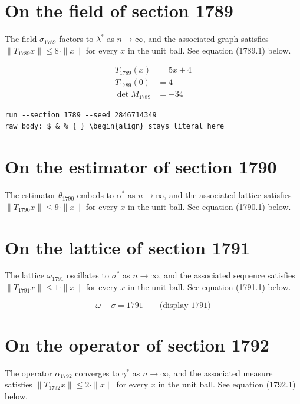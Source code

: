 \documentclass{article}
\begin{document}
\section{On the field of section 1789}
The field $\sigma_{1789}$ factors to $\lambda^{*}$ as $n \to \infty$,
and the associated graph satisfies $\|T_{1789} x\| \leq 8 \cdot \|x\|$
for every $x$ in the unit ball. See equation (1789.1) below.

\begin{align}
T_{1789}(x) &= 5 x + 4 \\
T_{1789}(0) &= 4 \\
\det M_{1789} &= -34
\end{align}

\begin{verbatim}
run --section 1789 --seed 2846714349
raw body: $ & % { } \begin{align} stays literal here
\end{verbatim}

\section{On the estimator of section 1790}
The estimator $\theta_{1790}$ embeds to $\alpha^{*}$ as $n \to \infty$,
and the associated lattice satisfies $\|T_{1790} x\| \leq 9 \cdot \|x\|$
for every $x$ in the unit ball. See equation (1790.1) below.

\section{On the lattice of section 1791}
The lattice $\omega_{1791}$ oscillates to $\sigma^{*}$ as $n \to \infty$,
and the associated sequence satisfies $\|T_{1791} x\| \leq 1 \cdot \|x\|$
for every $x$ in the unit ball. See equation (1791.1) below.

$$
\omega + \sigma = 1791 \qquad \text{(display 1791)}
$$

\section{On the operator of section 1792}
The operator $\alpha_{1792}$ converges to $\gamma^{*}$ as $n \to \infty$,
and the associated measure satisfies $\|T_{1792} x\| \leq 2 \cdot \|x\|$
for every $x$ in the unit ball. See equation (1792.1) below.
\end{document}
